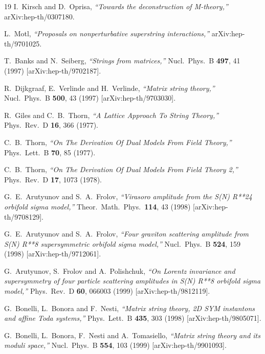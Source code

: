\documentclass[nohyper,12pt,letterpaper]{JHEP3}
\begin{document}
\begin{thebibliography}{19}
I.~Kirsch and D.~Oprisa,
{\it ``Towards the deconstruction of M-theory,''}
arXiv:hep-th/0307180.

L.~Motl,
{\it ``Proposals on nonperturbative superstring interactions,''}
arXiv:hep-th/9701025.

T.~Banks and N.~Seiberg,
{\it ``Strings from matrices,''}
Nucl.\ Phys.\ B {\bf 497}, 41 (1997)
[arXiv:hep-th/9702187].

R.~Dijkgraaf, E.~Verlinde and H.~Verlinde,
{\it ``Matrix string theory,''}
Nucl.\ Phys.\ B {\bf 500}, 43 (1997)
[arXiv:hep-th/9703030].

R.~Giles and C.~B.~Thorn,
{\it ``A Lattice Approach To String Theory,''}
Phys.\ Rev.\ D {\bf 16}, 366 (1977).

C.~B.~Thorn,
{\it ``On The Derivation Of Dual Models From Field Theory,''}
Phys.\ Lett.\ B {\bf 70}, 85 (1977).

C.~B.~Thorn,
{\it ``On The Derivation Of Dual Models From Field Theory 2,''}
Phys.\ Rev.\ D {\bf 17}, 1073 (1978).

G.~E.~Arutyunov and S.~A.~Frolov,
{\it ``Virasoro amplitude from the S(N) R**24 orbifold sigma model,''}
Theor.\ Math.\ Phys.\  {\bf 114}, 43 (1998)
[arXiv:hep-th/9708129].

G.~E.~Arutyunov and S.~A.~Frolov,
{\it ``Four graviton scattering amplitude from S(N) R**8 supersymmetric  
orbifold sigma model,''}
Nucl.\ Phys.\ B {\bf 524}, 159 (1998)
[arXiv:hep-th/9712061].

G.~Arutyunov, S.~Frolov and A.~Polishchuk,
{\it ``On Lorentz invariance and supersymmetry of four particle scattering  
amplitudes in S(N) R**8 orbifold sigma model,''}
Phys.\ Rev.\ D {\bf 60}, 066003 (1999)
[arXiv:hep-th/9812119].

G.~Bonelli, L.~Bonora and F.~Nesti,
{\it ``Matrix string theory, 2D SYM instantons and affine Toda systems,''}
Phys.\ Lett.\ B {\bf 435}, 303 (1998)
[arXiv:hep-th/9805071].

G.~Bonelli, L.~Bonora, F.~Nesti and A.~Tomasiello,
{\it ``Matrix string theory and its moduli space,''}
Nucl.\ Phys.\ B {\bf 554}, 103 (1999)
[arXiv:hep-th/9901093].


\end{thebibliography}
\end{document}

